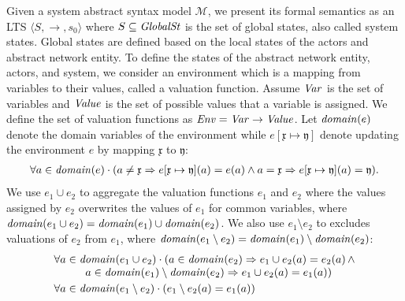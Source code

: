 Given a system abstract syntax model $\mathcal{M}$, we present its formal semantics as an LTS $\langle S,\rightarrow,s_0 \rangle$ where $S\subseteq \mathit{GlobalSt}$ %
is the set of global states, also called system states. Global states are defined based on the local states of the actors and abstract network entity. To define the states of the abstract network entity, actors, and system, we consider an environment which is a mapping from variables to their values, called a valuation function. Assume $\mathit{Var}$ is the set of variables and $\mathit{Value}$ is the set of possible values that a variable is assigned. We define the set of valuation functions as  $\mathit{Env}=\mathit{Var} \rightarrow \mathit{Value}$. Let $\mathit{domain}(e)$ denote the domain variables of the environment while $e[\mathfrak{x}\mapsto\mathfrak{y}]$ denote updating the environment $e$ by mapping $\mathfrak{x}$ to $\mathfrak{y}$:\[
\begin{array}{l}
\forall a\in\mathit{domain}(e)\cdot(a\neq\mathfrak{x}\Rightarrow e[\mathfrak{x}\mapsto\mathfrak{y}](a)=e(a) \wedge a=\mathfrak{x}\Rightarrow e[\mathfrak{x}\mapsto\mathfrak{y}](a)=\mathfrak{y}).
\end{array}
\]We use $e_1\cup e_2$ to aggregate the valuation functions $e_1$ and $e_2$ where the values assigned by $e_2$ overwrites the values of $e_1$ for common variables, where $\mathit{domain}(e_1\cup e_2)=\mathit{domain}(e_1)\cup\mathit{domain}(e_2)$. We also use $e_1\setminus e_2$ to excludes valuations of $e_2$ from $e_1$, where $\mathit{domain}(e_1\setminus e_2)=\mathit{domain}(e_1)\setminus\mathit{domain}(e_2)$:\[
\begin{array}{l} 
\forall a\in\domain(e_1 \cup e_2)\cdot(a\in \domain(e_2)\Rightarrow e_1\cup e_2(a) = e_2(a) \,\wedge \\ \hspace*{1cm} a\in \domain(e_1)\setminus\domain(e_2)\Rightarrow e_1\cup e_2(a) = e_1(a))\vspace*{1mm}\\
\forall a\in\domain(e_1 \setminus e_2)\cdot( e_1\setminus e_2(a) = e_1(a)) 
\end{array}
\]%

